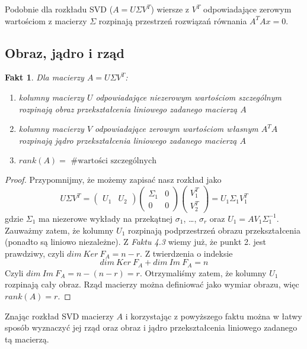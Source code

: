\documentclass{article}
\newtheorem{fact}[theorem]{Fakt}
\theoremstyle{definition}
\begin{document}
Podobnie dla rozkładu SVD ($A = U\Sigma V^T$) wiersze z $V^T$ odpowiadające zerowym wartościom z macierzy $\Sigma$ rozpinają przestrzeń rozwiązań równania $A^TA x =0$. 

\subsection{Obraz, jądro i rząd}
\begin{fact}
Dla macierzy $A = U \Sigma V^T$:
        \begin{enumerate}
            \item kolumny macierzy $U$ odpowiadające niezerowym wartościom szczególnym rozpinają obraz przekształcenia liniowego zadanego macierzą $A$
            \item kolumny macierzy $V$ odpowiadające zerowym wartościom własnym $A^TA$ rozpinają jądro przekształcenia liniowego zadanego macierzą $A$
            \item $rank(A) = \text{ \# wartości szczególnych}$
        \end{enumerate}
\end{fact}
\begin{proof}
Przypomnijmy, że możemy zapisać nasz rozkład jako
$$ U \Sigma V^T = \begin{pmatrix}
U_1 & U_2
\end{pmatrix}
\begin{pmatrix}
\Sigma_1 & 0 \\
0 & 0
\end{pmatrix}
\begin{pmatrix}
V_1^T \\ V_2^T
\end{pmatrix} = U_1 \Sigma_1 V_1^T
$$
gdzie $\Sigma_1$ ma niezerowe wykłady na przekątnej $\sigma_1$, \ldots, $\sigma_r$ oraz $U_1 = A V_1 \Sigma_1^{-1}$. Zauważmy zatem, że kolumny $U_1$ rozpinają podprzestrzeń obrazu przekształcenia (ponadto są liniowo niezależne). Z \textit{Faktu 4.3} wiemy już, że punkt 2. jest prawdziwy, czyli $dim \: Ker \: F_A = n-r$. Z twierdzenia o indeksie
$$ dim \: Ker \: F_A + dim \: Im \: F_A = n $$
Czyli $dim \: Im \: F_A = n - (n-r) = r$. Otrzymaliśmy zatem, że kolumny $U_1$ rozpinają cały obraz. Rząd macierzy można definiować jako wymiar obrazu, więc $rank(A) = r$.
\end{proof}
Znając rozkład SVD macierzy $A$ i korzystając z powyższego faktu można w łatwy sposób wyznaczyć jej rząd oraz obraz i jądro przekształcenia liniowego zadanego tą macierzą. 
\end{document}
